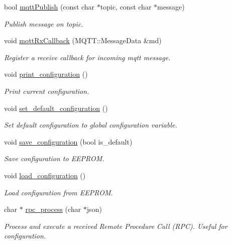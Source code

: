 \begin{DoxyCompactItemize}
bool \hyperlink{rmap_8ino_aa0d50218413a12917f8c70ef4e1e1e72}{mqtt\+Publish} (const char $\ast$topic, const char $\ast$message)
\begin{DoxyCompactList}\small\item\em Publish message on topic. \end{DoxyCompactList}\item 
void \hyperlink{rmap_8ino_a4fe2f970295d296f7f6725fe9e946933}{mqtt\+Rx\+Callback} (M\+Q\+T\+T\+::\+Message\+Data \&md)
\begin{DoxyCompactList}\small\item\em Register a receive callback for incoming mqtt message. \end{DoxyCompactList}\item 
void \hyperlink{rmap_8ino_a65b2dadc0411e43874ec8ed7f73bc62a}{print\+\_\+configuration} ()
\begin{DoxyCompactList}\small\item\em Print current configuration. \end{DoxyCompactList}\item 
void \hyperlink{rmap_8ino_a951e4934b8add405b8fe45417fc380f5}{set\+\_\+default\+\_\+configuration} ()
\begin{DoxyCompactList}\small\item\em Set default configuration to global configuration variable. \end{DoxyCompactList}\item 
void \hyperlink{rmap_8ino_afa979a8cb238fe81bf20654dfd6096ef}{save\+\_\+configuration} (bool is\+\_\+default)
\begin{DoxyCompactList}\small\item\em Save configuration to E\+E\+P\+R\+OM. \end{DoxyCompactList}\item 
void \hyperlink{rmap_8ino_a32a64a2800c724fb28e10636f2ec20b9}{load\+\_\+configuration} ()
\begin{DoxyCompactList}\small\item\em Load configuration from E\+E\+P\+R\+OM. \end{DoxyCompactList}\item 
char $\ast$ \hyperlink{rmap_8ino_a99f56f4c38f64be47b52818cbf57bb2d}{rpc\+\_\+process} (char $\ast$json)
\begin{DoxyCompactList}\small\item\em Process and execute a received Remote Procedure Call (R\+PC). Useful for configuration. \end{DoxyCompactList}\item 

\end{DoxyCompactItemize}
